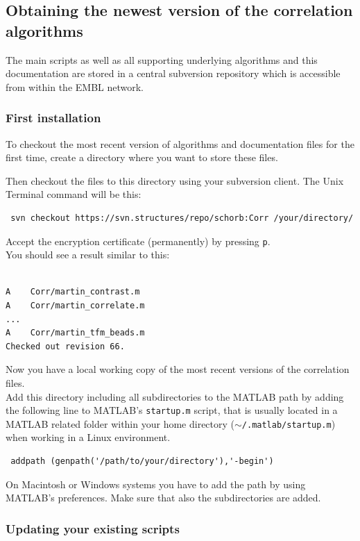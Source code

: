 \documentclass[10pt,a4paper,onepage,DIV12]{scrartcl}
\begin{document}
\subsection{Obtaining the newest version of the correlation algorithms}
The main scripts as well as all supporting underlying algorithms and this documentation are stored in a central subversion repository which is accessible from within the EMBL network.
\subsubsection*{First installation}
To checkout the most recent version of algorithms and documentation files for the first time, create a directory where you want to store these files. 

Then checkout the files to this directory using your subversion client. The Unix Terminal command will be this:
\begin{verbatim}
 svn checkout https://svn.structures/repo/schorb:Corr /your/directory/
\end{verbatim}
Accept the encryption certificate (permanently) by pressing \texttt{p}.\\

You should see a result similar to this:
\begin{verbatim}

A    Corr/martin_contrast.m 
A    Corr/martin_correlate.m
...
A    Corr/martin_tfm_beads.m
Checked out revision 66.

\end{verbatim}

Now you have a local working copy of the most recent versions of the correlation files.\\

Add this directory including all subdirectories to the MATLAB path by adding the following line to MATLAB's \texttt{startup.m} script, that is usually located in a MATLAB related folder within your home directory (\texttt{$\sim$/.matlab/startup.m}) when working in a Linux environment. 
\begin{verbatim}
 addpath (genpath('/path/to/your/directory'),'-begin')
\end{verbatim}
On Macintosh or Windows systems you have to add the path by using MATLAB's preferences. Make sure that also the subdirectories are added.\\
\subsubsection*{Updating your existing scripts}
\end{document}
